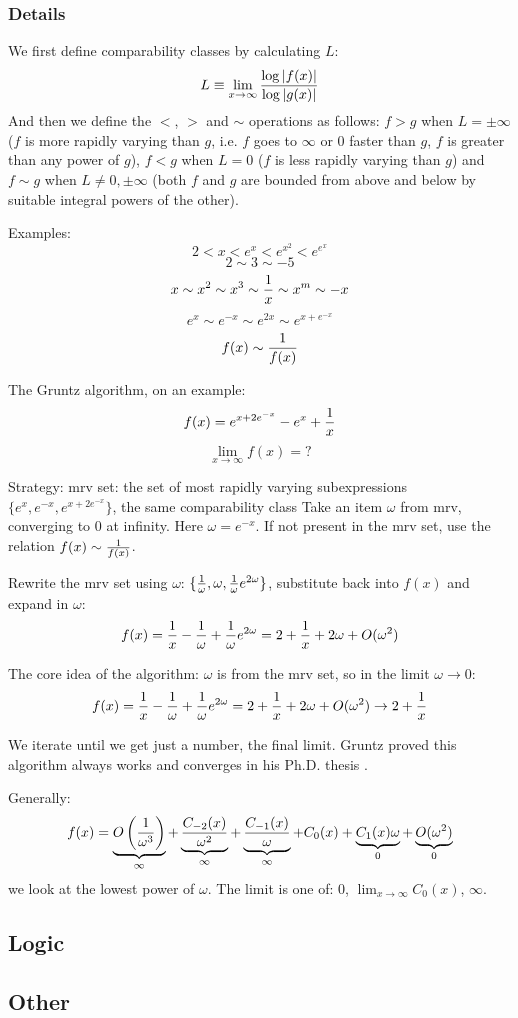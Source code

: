 \subsubsection{Details}

We first define comparability classes by calculating $L$:
\begin{equation}
L\equiv \lim_{x\to\infty} {\log |f(x)| \over \log |g(x)|}
\end{equation}
And then we define the $<$, $>$ and $\sim$ operations as follows: $f>g$ when
$L=\pm\infty$ ($f$ is more rapidly varying than $g$, i.e. $f$ goes to $\infty$
or $0$ faster than $g$, $f$ is greater than any power of $g$), $f<g$ when $L=0$
($f$ is less rapidly varying than $g$) and $f\sim g$ when $L\neq 0,\pm\infty$
(both $f$ and $g$ are bounded from above and below by suitable integral powers
of the other).

Examples:
$$2 < x < e^x < e^{x^2} < e^{e^x}$$
$$2\sim 3\sim -5$$
$$x\sim x^2\sim x^3\sim {1\over x}\sim x^m\sim -x$$
$$e^x\sim e^{-x}\sim e^{2x}\sim e^{x+e^{-x}}$$
$$f(x)\sim{1\over f(x)}$$

The Gruntz algorithm, on an example:
$$f(x) = e^{x+2e^{-x}} - e^x + {1\over x}$$
$$\lim_{x\to\infty} f(x) = ?$$

Strategy:
mrv set: the set of most rapidly varying subexpressions
$\{e^x, e^{-x}, e^{x+2e^{-x}}\}$, the same comparability class
Take an item $\omega$ from mrv, converging to 0 at infinity. Here
$\omega=e^{-x}$. If not present in the mrv set, use the relation
$f(x)\sim {1\over f(x)}$.

Rewrite the mrv set using $\omega$: $\{{1\over\omega}, \omega,
{1\over\omega}e^{2\omega}\}$, substitute back into $f(x)$ and expand in
$\omega$:
$$f(x) = {1\over x}-{1\over\omega}+{1\over\omega}e^{2\omega}
    = 2+{1\over x} + 2\omega + O(\omega^2)$$

The core idea of the algorithm: $\omega$ is from the mrv set, so in the limit
$\omega\to0$:
$$f(x) = {1\over x}-{1\over\omega}+{1\over\omega}e^{2\omega}
    = 2+{1\over x} + 2\omega + O(\omega^2)
    \to 2 + {1\over x}$$

We iterate until we get just a number, the final limit. Gruntz proved this
algorithm always works and converges in his Ph.D. thesis
\cite{gruntz1996computing}.

Generally:
$$ f(x) = \underbrace{O\left({1\over \omega^3}\right)}_\infty
    + \underbrace{C_{-2}(x)\over \omega^2}_\infty
    + \underbrace{C_{-1}(x)\over \omega}_\infty
    + {C_{0}(x)}
    + \underbrace{C_{1}(x)\omega}_0
    + \underbrace{O(\omega^2)}_0
$$
we look at the lowest power of $\omega$. The limit is one of: $0$,
$\lim_{x\to\infty} C_0(x)$, $\infty$.

\subsection{Logic}

\subsection{Other}
